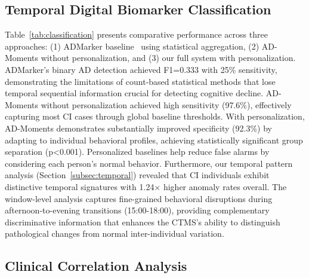 \documentclass[sigconf, anonymous, 9pt, nonacm]{acmart}
\newcommand{\sys}{AD-Moments\xspace}
\begin{document}
\subsection{Temporal Digital Biomarker Classification}

Table~\ref{tab:classification} presents comparative performance across three approaches: (1) ADMarker baseline~\cite{ouyang2024ADMarker} using statistical aggregation, (2) \sys without personalization, and (3) our full system with personalization.
ADMarker's binary AD detection achieved F1=0.333 with 25\% sensitivity, demonstrating the limitations of count-based statistical methods that lose temporal sequential information crucial for detecting cognitive decline. 
\sys without personalization achieved high sensitivity (97.6\%), effectively capturing most CI cases through global baseline thresholds. With personalization, \sys demonstrates substantially improved specificity (92.3\%) by adapting to individual behavioral profiles, achieving statistically significant group separation (p<0.001). Personalized baselines help reduce false alarms by considering each person's normal behavior.
Furthermore, our temporal pattern analysis (Section~\ref{subsec:temporal}) revealed that CI individuals exhibit distinctive temporal signatures with 1.24× higher anomaly rates overall. The window-level analysis captures fine-grained behavioral disruptions during afternoon-to-evening transitions (15:00-18:00), providing complementary discriminative information that enhances the CTMS's ability to distinguish pathological changes from normal inter-individual variation.


\subsection{Clinical Correlation Analysis}
\end{document}
